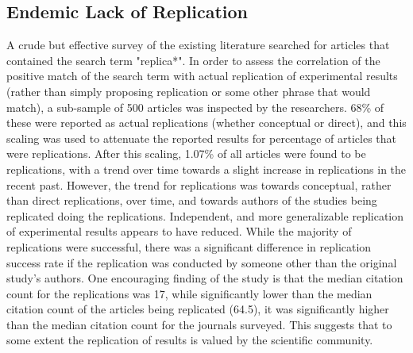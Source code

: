 \documentclass[12pt,a4paper,titlepage]{scrreprt}
\begin{document}
\subsection{Endemic Lack of Replication}

A crude but effective survey of the existing literature searched for articles that contained the search term "replica*"\cite{makel_replications_2012}. In order to assess the correlation of the positive match of the search term with actual replication of experimental results (rather than simply proposing replication or some other phrase that would match), a sub-sample of 500 articles was inspected by the researchers. 68\% of these were reported as actual replications (whether conceptual or direct), and this scaling was used to attenuate the reported results for percentage of articles that were replications.
After this scaling, 1.07\% of all articles were found to be replications, with a trend over time towards a slight increase in replications in the recent past. However, the trend for replications was towards conceptual, rather than direct replications, over time, and towards authors of the studies being replicated doing the replications. Independent, and more generalizable replication of experimental results appears to have reduced.
While the majority of replications were successful, there was a significant difference in replication success rate if the replication was conducted by someone other than the original study's authors.
One encouraging finding of the study is that the median citation count for the replications was 17, while significantly lower than the median citation count of the articles being replicated (64.5), it was significantly higher than the median citation count for the journals surveyed. This suggests that to some extent the replication of results is valued by the scientific community.
\end{document}
